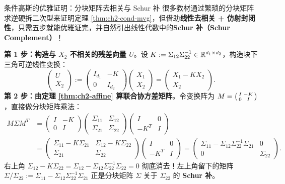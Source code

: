 \begin{extBox}{条件高斯的优雅证明：分块矩阵去相关与 Schur 补}
很多教材通过繁琐的分块矩阵求逆硬拆二次型来证明定理 \ref{thm:ch2-cond-mvg}，但借助\textbf{线性去相关 + 仿射封闭性}，只需五步就能优雅证完，并自然引出线性代数中的\textbf{Schur 补（Schur Complement）}！

\textbf{第 1 步：构造与 $X_2$ 不相关的残差向量 $U$}。设 $K := \Sigma_{12}\Sigma_{22}^{-1} \in \mathbb{R}^{d_1\times d_2}$，构造块下三角可逆线性变换：
\[
  \begin{pmatrix} U \\ X_2 \end{pmatrix}
  := \begin{pmatrix} I_{d_1} & -K \\ 0 & I_{d_2} \end{pmatrix} \begin{pmatrix} X_1 \\ X_2 \end{pmatrix}
  = \begin{pmatrix} X_1 - K X_2 \\ X_2 \end{pmatrix}.
\]
\textbf{第 2 步：由定理 \ref{thm:ch2-affine} 算联合协方差矩阵}。令变换阵为 $M = \begin{psmallmatrix} I & -K \\ 0 & I \end{psmallmatrix}$，直接做分块矩阵乘法：
\begin{align*}
  M \Sigma M^T
  &= \begin{pmatrix} I & -K \\ 0 & I \end{pmatrix}
     \begin{pmatrix} \Sigma_{11} & \Sigma_{12} \\ \Sigma_{21} & \Sigma_{22} \end{pmatrix}
     \begin{pmatrix} I & 0 \\ -K^T & I \end{pmatrix} \\
  &= \begin{pmatrix} \Sigma_{11} - K\Sigma_{21} & \Sigma_{12} - K\Sigma_{22} \\ \Sigma_{21} & \Sigma_{22} \end{pmatrix}
     \begin{pmatrix} I & 0 \\ -K^T & I \end{pmatrix}
   = \begin{pmatrix} \Sigma_{11} - \Sigma_{12}\Sigma_{22}^{-1}\Sigma_{21} & 0 \\ 0 & \Sigma_{22} \end{pmatrix}.
\end{align*}
右上角 $\Sigma_{12} - K\Sigma_{22} = \Sigma_{12} - \Sigma_{12}\Sigma_{22}^{-1}\Sigma_{22} = 0$ 彻底消去！左上角留下的矩阵 $\Sigma / \Sigma_{22} := \Sigma_{11} - \Sigma_{12}\Sigma_{22}^{-1}\Sigma_{21}$ 正是分块矩阵 $\Sigma$ 关于 $\Sigma_{22}$ 的 \textbf{Schur 补}。


\end{extBox}
